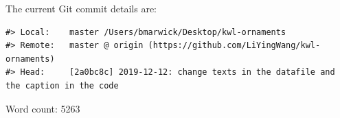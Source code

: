 \documentclass[]{article}
\begin{document}
The current Git commit details are:

\begin{verbatim}
#> Local:    master /Users/bmarwick/Desktop/kwl-ornaments
#> Remote:   master @ origin (https://github.com/LiYingWang/kwl-ornaments)
#> Head:     [2a0bc8c] 2019-12-12: change texts in the datafile and the caption in the code
\end{verbatim}

Word count: 5263
\end{document}
